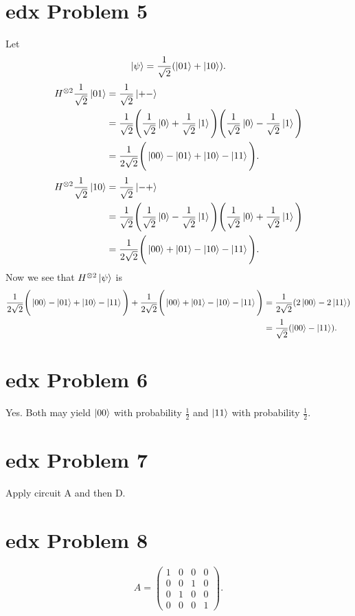 \documentclass[10pt]{article}
\begin{document}
\section*{edx Problem 5}
Let
\[
\ket{\psi} = \frac{1}{\sqrt{2}} (\ket{01} + \ket{10}).
\]
\begin{align*}
H^{\otimes 2} \frac{1}{\sqrt{2}} \ket{01} &= \frac{1}{\sqrt{2}} \ket{+-} \\
                                        						&= \frac{1}{\sqrt{2}} \Bigg( \frac{1}{\sqrt{2}} \ket{0} + \frac{1}{\sqrt{2}} \ket{1} \Bigg)\Bigg( \frac{1}{\sqrt{2}} \ket{0} - \frac{1}{\sqrt{2}} \ket{1} \Bigg) \\
                                        						&= \frac{1}{2\sqrt{2}} \Bigg( \ket{00} - \ket{01} + \ket{10} - \ket{11} \Bigg).
\end{align*}
\begin{align*}
H^{\otimes 2} \frac{1}{\sqrt{2}} \ket{10} &= \frac{1}{\sqrt{2}} \ket{-+} \\
                                        						&= \frac{1}{\sqrt{2}} \Bigg( \frac{1}{\sqrt{2}} \ket{0} - \frac{1}{\sqrt{2}} \ket{1} \Bigg)\Bigg( \frac{1}{\sqrt{2}} \ket{0} + \frac{1}{\sqrt{2}} \ket{1} \Bigg) \\
                                        						&= \frac{1}{2\sqrt{2}} \Bigg( \ket{00} + \ket{01} - \ket{10} - \ket{11} \Bigg).
\end{align*}
Now we see that $H^{\otimes 2} \ket{\psi}$ is
\begin{align*}
\frac{1}{2\sqrt{2}} \Bigg( \ket{00} - \ket{01} + \ket{10} - \ket{11} \Bigg) + \frac{1}{2\sqrt{2}} \Bigg( \ket{00} + \ket{01} - \ket{10} - \ket{11} \Bigg) &= \frac{1}{2\sqrt{2}} (2\ket{00} - 2\ket{11}) \\
     &= \frac{1}{\sqrt{2}} (\ket{00} - \ket{11}).
\end{align*}

\section*{edx Problem 6}
Yes. Both may yield $\ket{00}$ with probability $\frac{1}{2}$ and $\ket{11}$ with probability $\frac{1}{2}$.

\section*{edx Problem 7} 
Apply circuit A and then D.

\section*{edx Problem 8}
\[
A = \begin{pmatrix}
1 & 0 & 0 & 0 \\
0 & 0 & 1 & 0 \\
0 & 1 & 0 & 0 \\
0 & 0 & 0 & 1 
\end{pmatrix}.
\]
\end{document}
